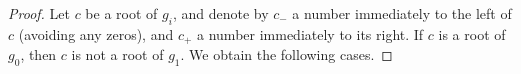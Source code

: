 \documentclass[12pt]{amsart}
\theoremstyle{definition}
\begin{document}
\begin{proof}
\noindent Let $c$ be a root of $g_{i}$, and denote by $c_{-}$ a number immediately to the left of $c$ (avoiding any zeros), and $c_{+}$ a number immediately to its right. If $c$ is a root of $g_{0}$, then $c$ is not a root of $g_{1}$. We obtain the following cases.



\end{proof}
\end{document}
